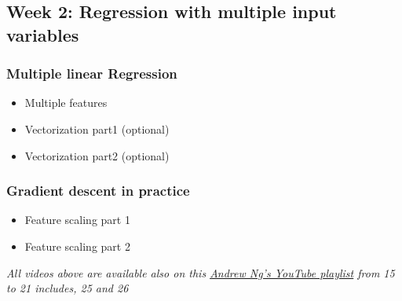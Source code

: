 \subsection*{Week 2: Regression with multiple input variables}

\subsubsection*{Multiple linear Regression}  
\begin{itemize}
  \item Multiple features
  \item Vectorization part1 (optional)
  \item Vectorization part2 (optional)
\end{itemize}

\subsubsection*{Gradient descent in practice}  
\begin{itemize}
  \item Feature scaling part 1
  \item Feature scaling part 2
\end{itemize}

\emph{All videos above are available also on this \href{https://youtube.com/playlist?list=PLkDaE6sCZn6FNC6YRfRQc_FbeQrF8BwGI&feature=shared}{Andrew Ng's YouTube playlist} from 15 to 21 includes, 25 and 26}


